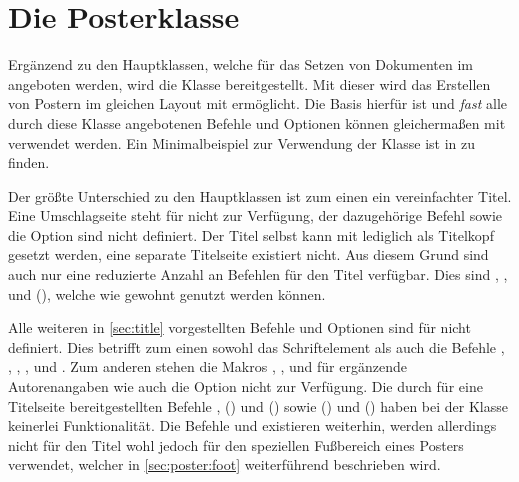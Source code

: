 \chapter[Die Posterklasse \Class*{tudscrposter}]{Die Posterklasse}
%
\begin{Bundle*}[v2.05]{}
%
\printchangedatlist%
%
Ergänzend zu den Hauptklassen, welche für das Setzen von Dokumenten im \TUDCD 
angeboten werden, wird die Klasse  bereitgestellt. Mit 
dieser wird das Erstellen von Postern im gleichen Layout mit  
ermöglicht. Die Basis hierfür ist  und \emph{fast} alle 
durch diese Klasse angebotenen Befehle und Optionen können gleichermaßen mit 
 verwendet werden. Ein Minimalbeispiel zur Verwendung der 
Klasse ist in  zu finden.

Der größte Unterschied zu den Hauptklassen ist zum einen ein vereinfachter 
Titel. Eine Umschlagseite steht für  nicht zur Verfügung, 
der dazugehörige Befehl  sowie die Option  
sind nicht definiert. Der Titel selbst kann mit  lediglich als 
Titelkopf gesetzt werden, eine separate Titelseite existiert nicht. Aus diesem 
Grund sind auch nur eine reduzierte Anzahl an Befehlen für den Titel verfügbar. 
Dies sind , ,  und 
(), welche wie gewohnt genutzt werden 
können.

Alle weiteren in \autoref{sec:title} vorgestellten Befehle und Optionen sind 
für  nicht definiert. Dies betrifft zum einen sowohl das 
Schriftelement  als auch die Befehle , 
, , ,  und  
. Zum anderen stehen die Makros , 
,  und  
für ergänzende Autorenangaben wie auch die Option  nicht 
zur Verfügung. Die durch \KOMAScript{} für eine Titelseite bereitgestellten 
Befehle , () und 
() sowie 
() und 
() haben bei der Klasse 
 keinerlei Funktionalität. Die Befehle  und 
 existieren weiterhin, werden allerdings nicht für den Titel 
wohl jedoch für den speziellen Fußbereich eines Posters verwendet, welcher in 
\autoref{sec:poster:foot} weiterführend beschrieben wird.


\end{Bundle*}
